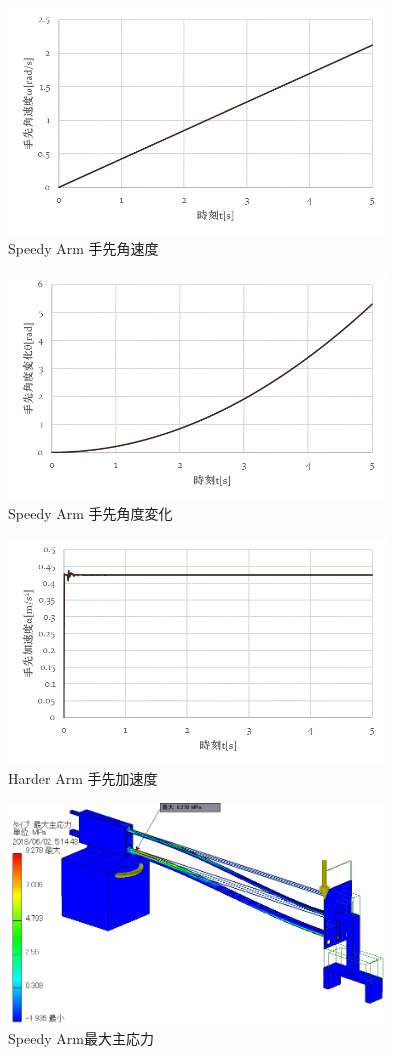 \documentclass[10pt,b5paper,papersize,dvipdfmx]{jsbook}
\begin{document}
\begin{figure}[htbp]
  \centering
  \includegraphics[width=10cm]{img/robot25.png}
  \caption{Speedy Arm 手先角速度}
  \label{fig:Speedy Arm 手先角速度}
\end{figure}
\begin{figure}[htbp]
  \centering
  \includegraphics[width=10cm]{img/robot26.png}
  \caption{Speedy Arm 手先角度変化}
  \label{fig:Speedy Arm 手先角度変化}
\end{figure}
\begin{figure}[htbp]
  \centering
  \includegraphics[width=10cm]{img/robot27.png}
  \caption{Harder Arm 手先加速度}
  \label{fig:Harder Arm 手先加速度2}
\end{figure}
\begin{figure}[htbp]
  \centering
  \includegraphics[width=10cm]{img/robot28.png}
  \caption{Speedy Arm最大主応力}
  \label{fig:Speedy Arm最大主応力}
\end{figure}
\end{document}
